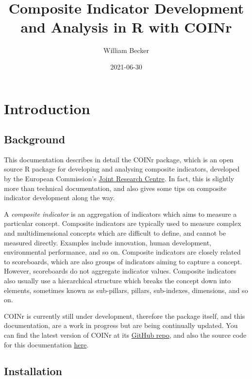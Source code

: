 \documentclass[
]{book}
\title{Composite Indicator Development and Analysis in R with COINr}
\author{William Becker}
\date{2021-06-30}
\begin{document}
\maketitle

{
\setcounter{tocdepth}{1}
\tableofcontents
}
\hypertarget{introduction}{%
\chapter{Introduction}\label{introduction}}

\hypertarget{background}{%
\section{Background}\label{background}}

This documentation describes in detail the COINr package, which is an open source R package for developing and analysing composite indicators, developed by the European Commission's \href{https://knowledge4policy.ec.europa.eu/composite-indicators/about_en}{Joint Research Centre}. In fact, this is slightly more than technical documentation, and also gives some tips on composite indicator development along the way.

A \emph{composite indicator} is an aggregation of indicators which aims to measure a particular concept. Composite indicators are typically used to measure complex and multidimensional concepts which are difficult to define, and cannot be measured directly. Examples include innovation, human development, environmental performance, and so on. Composite indicators are closely related to scoreboards, which are also groups of indicators aiming to capture a concept. However, scoreboards do not aggregate indicator values. Composite indicators also usually use a hierarchical structure which breaks the concept down into elements, sometimes known as sub-pillars, pillars, sub-indexes, dimensions, and so on.

COINr is currently still under development, therefore the package itself, and this documentation, are a work in progress but are being continually updated. You can find the latest version of COINr at its \href{https://github.com/bluefoxr/COINr}{GitHub repo}, and also the source code for this documentation \href{https://github.com/bluefoxr/COINrDoc}{here}.

\hypertarget{installation}{%
\section{Installation}\label{installation}}
\end{document}
